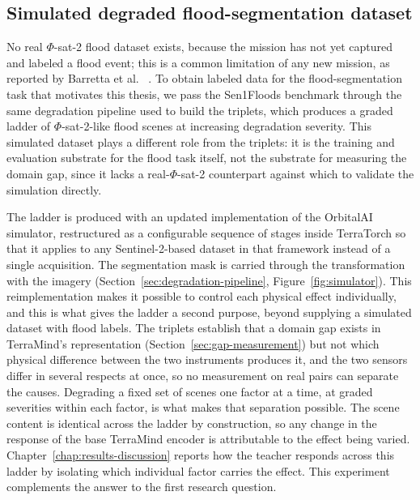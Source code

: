 \clearpage

\subsection{Simulated degraded flood-segmentation dataset}
\label{sec:sen1floods-sim}

No real $\Phi$-sat-2 flood dataset exists, because the mission has not yet captured and labeled a flood event; this is a common limitation of any new mission, as reported by Barretta et al.
~\cite{barretta2026onboardaireview}.
To obtain labeled data for the flood-segmentation task that motivates this thesis, we pass the Sen1Floods benchmark through the same degradation pipeline used to build the triplets, which produces a graded ladder of $\Phi$-sat-2-like flood scenes at increasing degradation severity.
This simulated dataset plays a different role from the triplets: it is the training and evaluation substrate for the flood task itself, not the substrate for measuring the domain gap, since it lacks a real-$\Phi$-sat-2 counterpart against which to validate the simulation directly.

The ladder is produced with an updated implementation of the OrbitalAI simulator, restructured as a configurable sequence of stages inside TerraTorch so that it applies to any Sentinel-2-based dataset in that framework instead of a single acquisition.
The segmentation mask is carried through the transformation with the imagery (Section~\ref{sec:degradation-pipeline}, Figure~\ref{fig:simulator}).
This reimplementation makes it possible to control each physical effect individually, and this is what gives the ladder a second purpose, beyond supplying a simulated dataset with flood labels.
The triplets establish that a domain gap exists in TerraMind's representation (Section~\ref{sec:gap-measurement}) but not which physical difference between the two instruments produces it, and the two sensors differ in several respects at once, so no measurement on real pairs can separate the causes.
Degrading a fixed set of scenes one factor at a time, at graded severities within each factor, is what makes that separation possible.
The scene content is identical across the ladder by construction, so any change in the response of the base TerraMind encoder is attributable to the effect being varied.
Chapter~\ref{chap:results-discussion} reports how the teacher responds across this ladder by isolating which individual factor carries the effect.
This experiment complements the answer to the first research question.

